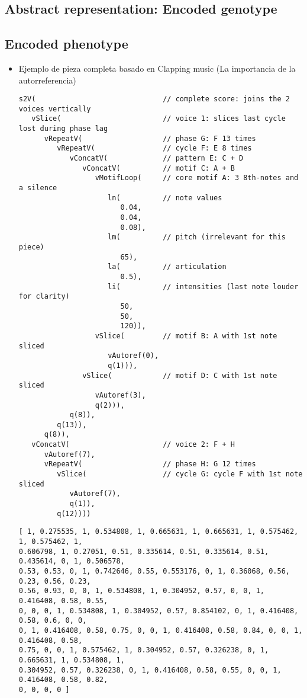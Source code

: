 \documentclass{article}
\begin{document}
\subsection{Abstract representation: Encoded genotype}
\subsection{Encoded phenotype}



\begin{itemize}
\item Ejemplo de pieza completa basado en Clapping music (La importancia de la autorreferencia)

{\small \begin{verbatim}
s2V(                              // complete score: joins the 2 voices vertically
   vSlice(                        // voice 1: slices last cycle lost during phase lag   
      vRepeatV(                   // phase G: F 13 times
         vRepeatV(                // cycle F: E 8 times 
            vConcatV(             // pattern E: C + D
               vConcatV(          // motif C: A + B
                  vMotifLoop(     // core motif A: 3 8th-notes and a silence
                     ln(          // note values
                        0.04,
                        0.04,
                        0.08),
                     lm(          // pitch (irrelevant for this piece)
                        65),
                     la(          // articulation
                        0.5),
                     li(          // intensities (last note louder for clarity)
                        50,
                        50,
                        120)),
                  vSlice(         // motif B: A with 1st note sliced
                     vAutoref(0),
                     q(1))),
               vSlice(            // motif D: C with 1st note sliced
                  vAutoref(3),
                  q(2))),
            q(8)),
         q(13)),
      q(8)),
   vConcatV(                      // voice 2: F + H
      vAutoref(7),
      vRepeatV(                   // phase H: G 12 times 
         vSlice(                  // cycle G: cycle F with 1st note sliced
            vAutoref(7),
            q(1)),
         q(12))))
\end{verbatim}}

{\small \begin{verbatim}[ 1, 0.275535, 1, 0.534808, 1, 0.665631, 1, 0.665631, 1, 0.575462, 1, 0.575462, 1, 
0.606798, 1, 0.27051, 0.51, 0.335614, 0.51, 0.335614, 0.51, 0.435614, 0, 1, 0.506578, 
0.53, 0.53, 0, 1, 0.742646, 0.55, 0.553176, 0, 1, 0.36068, 0.56, 0.23, 0.56, 0.23, 
0.56, 0.93, 0, 0, 1, 0.534808, 1, 0.304952, 0.57, 0, 0, 1, 0.416408, 0.58, 0.55, 
0, 0, 0, 1, 0.534808, 1, 0.304952, 0.57, 0.854102, 0, 1, 0.416408, 0.58, 0.6, 0, 0, 
0, 1, 0.416408, 0.58, 0.75, 0, 0, 1, 0.416408, 0.58, 0.84, 0, 0, 1, 0.416408, 0.58, 
0.75, 0, 0, 1, 0.575462, 1, 0.304952, 0.57, 0.326238, 0, 1, 0.665631, 1, 0.534808, 1, 
0.304952, 0.57, 0.326238, 0, 1, 0.416408, 0.58, 0.55, 0, 0, 1, 0.416408, 0.58, 0.82, 
0, 0, 0, 0 ]\end{verbatim}}


\end{itemize}
\end{document}
